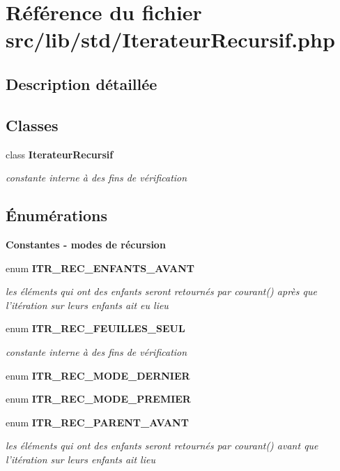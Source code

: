 \section{Référence du fichier src/lib/std/IterateurRecursif.php}
\label{_iterateur_recursif_8php}


\subsection{Description détaillée}


\subsection*{Classes}
\begin{CompactItemize}
\item 
class {\bf IterateurRecursif}
\begin{CompactList}\small\item\em constante interne à des fins de vérification \item\end{CompactList}\end{CompactItemize}
\subsection*{Énumérations}
\begin{Indent}{\bf Constantes - modes de récursion}\par
\begin{CompactItemize}
\item 
enum {\bf ITR\_\-REC\_\-ENFANTS\_\-AVANT} 
\begin{CompactList}\small\item\em les éléments qui ont des enfants seront retournés par courant() après que l'itération sur leurs enfants ait eu lieu \item\end{CompactList}\item 
enum {\bf ITR\_\-REC\_\-FEUILLES\_\-SEUL} 
\begin{CompactList}\small\item\em constante interne à des fins de vérification \item\end{CompactList}\item 
enum \textbf{ITR\_\-REC\_\-MODE\_\-DERNIER} 
\item 
enum \textbf{ITR\_\-REC\_\-MODE\_\-PREMIER} 
\item 
enum {\bf ITR\_\-REC\_\-PARENT\_\-AVANT} 
\begin{CompactList}\small\item\em les éléments qui ont des enfants seront retournés par courant() avant que l'itération sur leurs enfants ait lieu \item\end{CompactList}\end{CompactItemize}
\end{Indent}


